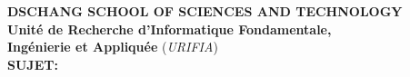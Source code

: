 \parbox{\paperwidth}{
	\centering
	\textsc{\large\textbf{DSCHANG SCHOOL OF SCIENCES AND TECHNOLOGY}}\\
	\vspace{0.8cm}
	{\large\textbf{Unit\'e de Recherche d'Informatique Fondamentale,\\ Ing\'enierie et Appliqu\'ee} (\textit{URIFIA})}\\\vspace{0.4cm}
	{\large\scshape\textbf{SUJET:}}\\
	\vfill
	
}